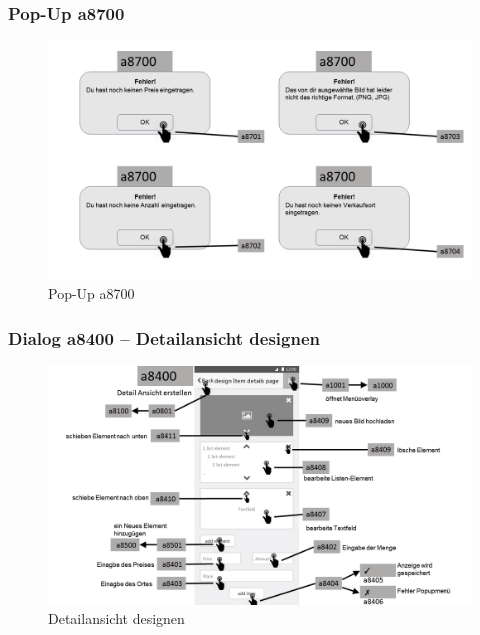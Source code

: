 \documentclass[a4paper,12pt,oneside]{scrartcl}
\begin{document}
\subsubsection{Pop-Up a8700}
\begin{figure}[!htbp]
\centering
\noindent\includegraphics[width=\linewidth,height=\textheight,keepaspectratio]{Dialoge/a8700p}
\caption{Pop-Up a8700}
\end{figure}
\FloatBarrier

\subsubsection{Dialog a8400 – Detailansicht designen}
\begin{figure}[!htbp]
\centering
\noindent\includegraphics[width=\linewidth,height=\textheight,keepaspectratio]{Dialoge/a8400}
\caption{Detailansicht designen}
\end{figure}
\FloatBarrier
\end{document}
